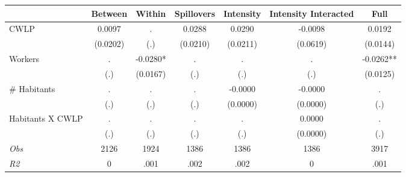 \begin{tabular}{l*{6}{c}}\hline&\multicolumn{1}{c}{Between}&\multicolumn{1}{c}{Within}&\multicolumn{1}{c}{Spillovers}&\multicolumn{1}{c}{Intensity}&\multicolumn{1}{c}{Intensity Interacted}&\multicolumn{1}{c}{Full}\\ \hline 
CWLP & 0.0097 & . & 0.0288 & 0.0290 & -0.0098 & 0.0192 \\
 & (0.0202) & (.) & (0.0210) & (0.0211) & (0.0619) & (0.0144) \\
Workers & . & -0.0280* & . & . & . & -0.0262** \\
 & (.) & (0.0167) & (.) & (.) & (.) & (0.0125) \\
\# Habitants & . & . & . & -0.0000 & -0.0000 & . \\
 & (.) & (.) & (.) & (0.0000) & (0.0000) & (.) \\
Habitants X CWLP & . & . & . & . & 0.0000 & . \\
 & (.) & (.) & (.) & (.) & (0.0000) & (.) \\
\hline \textit{Obs} & 2126 & 1924 & 1386 & 1386 & 1386 & 3917 \\ \textit{R2} & 0 & .001 & .002 & .002 & 0 & .001 \\ \hline \end{tabular}
